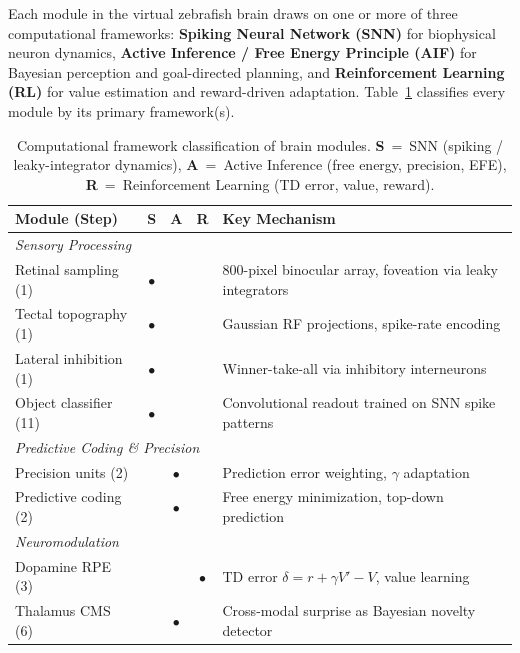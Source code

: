 \documentclass[11pt,a4paper]{article}
\begin{document}
Each module in the virtual zebrafish brain draws on one or more of three
computational frameworks:
\textbf{Spiking Neural Network (SNN)} for biophysical neuron dynamics,
\textbf{Active Inference / Free Energy Principle (AIF)} for Bayesian
perception and goal-directed planning, and
\textbf{Reinforcement Learning (RL)} for value estimation and reward-driven
adaptation.
Table~\ref{tab:framework} classifies every module by its primary framework(s).

\begin{table}[H]
\centering
\caption{Computational framework classification of brain modules.
  \textbf{S}~=~SNN (spiking / leaky-integrator dynamics),
  \textbf{A}~=~Active Inference (free energy, precision, EFE),
  \textbf{R}~=~Reinforcement Learning (TD error, value, reward).}
\label{tab:framework}
\small
\begin{tabular}{lcccp{5.8cm}}
\toprule
Module (Step) & S & A & R & Key Mechanism \\
\midrule
\multicolumn{5}{l}{\textit{Sensory Processing}} \\
Retinal sampling (1)           & $\bullet$ &           &           & 800-pixel binocular array, foveation via leaky integrators \\
Tectal topography (1)          & $\bullet$ &           &           & Gaussian RF projections, spike-rate encoding \\
Lateral inhibition (1)         & $\bullet$ &           &           & Winner-take-all via inhibitory interneurons \\
Object classifier (11)         & $\bullet$ &           &           & Convolutional readout trained on SNN spike patterns \\
\midrule
\multicolumn{5}{l}{\textit{Predictive Coding \& Precision}} \\
Precision units (2)            &           & $\bullet$ &           & Prediction error weighting, $\gamma$ adaptation \\
Predictive coding (2)          &           & $\bullet$ &           & Free energy minimization, top-down prediction \\
\midrule
\multicolumn{5}{l}{\textit{Neuromodulation}} \\
Dopamine RPE (3)               &           &           & $\bullet$ & TD error $\delta = r + \gamma V' - V$, value learning \\
Thalamus CMS (6)               &           & $\bullet$ &           & Cross-modal surprise as Bayesian novelty detector \\

\end{tabular}
\end{table}
\end{document}
